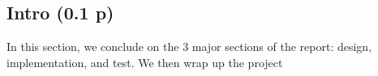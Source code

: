 \subsection{Intro (0.1 p) }

In this section, we conclude on the 3 major sections of the report: design, implementation, and test. We then wrap up the project 